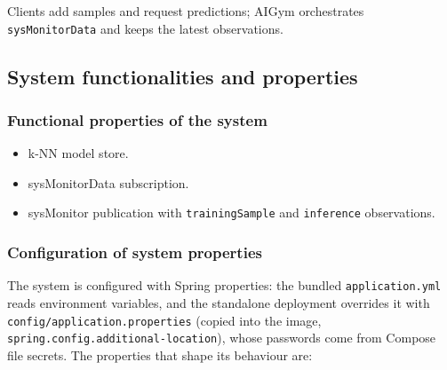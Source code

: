 \documentclass[a4paper]{arrowhead}
\begin{document}
Clients add samples and request predictions; AIGym orchestrates \texttt{sysMonitorData} and keeps the latest observations.

\subsection{System functionalities and properties}
\label{sec:properties}

\subsubsection{Functional properties of the system}

\begin{itemize}
  \item k-NN model store.
  \item sysMonitorData subscription.
  \item sysMonitor publication with \texttt{trainingSample} and \texttt{inference} observations.
\end{itemize}

\subsubsection{Configuration of system properties}

The system is configured with Spring properties: the bundled \texttt{application.\allowbreak{}yml} reads environment variables, and the standalone deployment overrides it with \texttt{config/\allowbreak{}application.\allowbreak{}properties} (copied into the image, \texttt{spring.\allowbreak{}config.\allowbreak{}additional-\allowbreak{}location}), whose passwords come from Compose file secrets. The properties that shape its behaviour are:
\end{document}
